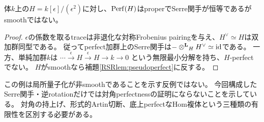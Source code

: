 \begin{proposition}[Serre自己同値はsmoothnessを含意しない]\label{RSRprop:warning}
体$k$上の$H=k[\epsilon]/(\epsilon^2)$に対し、$\operatorname{Perf}(H)$はproperでSerre関手が恒等であるがsmoothではない。
\end{proposition}
\begin{proof}
$\epsilon$の係数を取るtraceは非退化な対称Frobenius pairingを与え、$H^\vee\simeq H$は双加群同型である。
従ってperfect加群上のSerre関手は$-\mathbin{\otimes^{\mathbf L}}_HH^\vee\simeq\mathrm{id}$である。
一方、単純加群$k$は
$\cdots\xrightarrow{\epsilon}H\xrightarrow{\epsilon}H\to k\to0$
という無限最小分解を持ち、$H$-perfectでない。
$H$がsmoothなら補題\ref{RSRlem:pseudoperfect}に反する。
\end{proof}

この例は局所量子化が非smoothであることを示す反例ではない。
今回構成したSerre関手・逆rotationだけでは対角perfectnessの証明にならないことを示している。
対角の持上げ、形式的Artin切断、底上perfectなHom複体という三種類の有限性を区別する必要がある。

